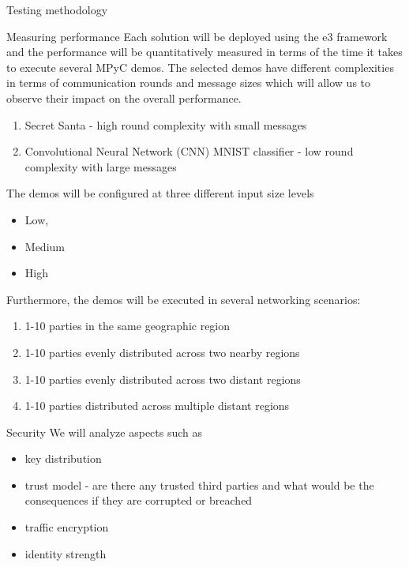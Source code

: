\begin{frame}{Testing methodology}
\begin{block}{Measuring performance}
Each solution will be deployed using the \gls{e3} framework and the
performance will be quantitatively measured in terms of the time it
takes to execute several MPyC demos. The selected demos have different
complexities in terms of communication rounds and message sizes which
will allow us to observe their impact on the overall performance.

\begin{enumerate}
\tightlist
\item
  Secret Santa - high round complexity with small messages
\item
  Convolutional Neural Network (CNN) MNIST classifier - low round
  complexity with large messages
\end{enumerate}

The demos will be configured at three different input size levels

\begin{itemize}
\tightlist
\item
  Low,
\item
  Medium
\item
  High
\end{itemize}

Furthermore, the demos will be executed in several networking scenarios:

\begin{enumerate}
\tightlist
\item
  1-10 parties in the same geographic region
\item
  1-10 parties evenly distributed across two nearby regions
\item
  1-10 parties evenly distributed across two distant regions
\item
  1-10 parties distributed across multiple distant regions
\end{enumerate}
\end{block}

\begin{block}{Security}
\protect\hypertarget{thesis__030-methods.md__security}{}
We will analyze aspects such as

\begin{itemize}
\tightlist
\item
  key distribution
\item
  trust model - are there any trusted third parties and what would be
  the consequences if they are corrupted or breached
\item
  traffic encryption
\item
  identity strength
\end{itemize}
\end{block}


\end{frame}
